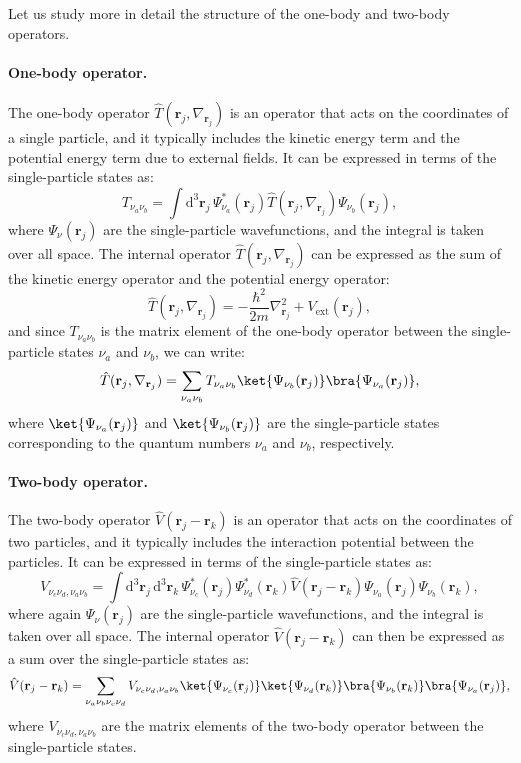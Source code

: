 Let us study more in detail the structure of the one-body and two-body operators.

\paragraph{One-body operator.}
The one-body operator \(\hat{T}(\mathbf{r}_j, \nabla_{\mathbf{r}_j})\) is an operator that acts on the coordinates of a single particle, and it typically includes the kinetic energy term and the potential energy term due to external fields. It can be expressed in terms of the single-particle states as:
\[
    T_{\nu_a \nu_b} = \int \mathrm{d}^3 \mathbf{r}_j \, \Psi_{\nu_a}^*(\mathbf{r}_j) \hat{T}(\mathbf{r}_j, \nabla_{\mathbf{r}_j}) \Psi_{\nu_b}(\mathbf{r}_j),
\]
where \(\Psi_{\nu}(\mathbf{r}_j)\) are the single-particle wavefunctions, and the integral is taken over all space. The internal operator \(\hat{T}(\mathbf{r}_j, \nabla_{\mathbf{r}_j})\) can be expressed as the sum of the kinetic energy operator and the potential energy operator:
\[
    \hat{T}(\mathbf{r}_j, \nabla_{\mathbf{r}_j}) = -\frac{\hbar^2}{2m} \nabla_{\mathbf{r}_j}^2 + V_{\text{ext}}(\mathbf{r}_j),
\]
and since \(T_{\nu_a \nu_b}\) is the matrix element of the one-body operator between the single-particle states \(\nu_a\) and \(\nu_b\), we can write:
\[
    \hat{T}(\mathbf{r}_j, \nabla_{\mathbf{r}_j}) = \sum_{\nu_a \nu_b} T_{\nu_a \nu_b} \ket{\Psi_{\nu_b}(\mathbf{r}_j)} \bra{\Psi_{\nu_a}(\mathbf{r}_j)},
\]
where \(\ket{\Psi_{\nu_a}(\mathbf{r}_j)}\) and \(\ket{\Psi_{\nu_b}(\mathbf{r}_j)}\) are the single-particle states corresponding to the quantum numbers \(\nu_a\) and \(\nu_b\), respectively.

\paragraph{Two-body operator.}
The two-body operator \(\hat{V}(\mathbf{r}_j - \mathbf{r}_k)\) is an operator that acts on the coordinates of two particles, and it typically includes the interaction potential between the particles. It can be expressed in terms of the single-particle states as:
\[
    V_{\nu_c \nu_d, \nu_a \nu_b} = \int \mathrm{d}^3 \mathbf{r}_j \, \mathrm{d}^3 \mathbf{r}_k \, \Psi_{\nu_c}^*(\mathbf{r}_j) \Psi_{\nu_d}^*(\mathbf{r}_k) \hat{V}(\mathbf{r}_j - \mathbf{r}_k) \Psi_{\nu_a}(\mathbf{r}_j) \Psi_{\nu_b}(\mathbf{r}_k),
\]
where again \(\Psi_{\nu}(\mathbf{r}_j)\) are the single-particle wavefunctions, and the integral is taken over all space. The internal operator \(\hat{V}(\mathbf{r}_j - \mathbf{r}_k)\) can then be expressed as a sum over the single-particle states as:
\[
    \hat{V}(\mathbf{r}_j - \mathbf{r}_k) = \sum_{\nu_a \nu_b \nu_c \nu_d} V_{\nu_c \nu_d, \nu_a \nu_b} \ket{\Psi_{\nu_c}(\mathbf{r}_j)} \ket{\Psi_{\nu_d}(\mathbf{r}_k)} \bra{\Psi_{\nu_b}(\mathbf{r}_k)} \bra{\Psi_{\nu_a}(\mathbf{r}_j)},
\]
where \(V_{\nu_c \nu_d, \nu_a \nu_b}\) are the matrix elements of the two-body operator between the single-particle states.

